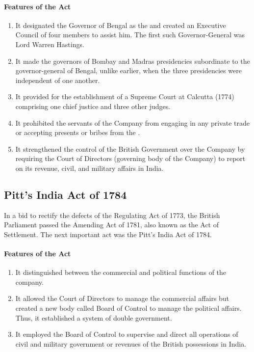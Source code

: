 \paragraph{Features of the Act}

\begin{enumerate}
  \item It designated the Governor of Bengal as the  and created an Executive Council of four members to assist him. The first such Governor-General was Lord Warren Hastings.
  \item It made the governors of Bombay and Madras presidencies subordinate to the governor-general of Bengal, unlike earlier, when the three presidencies were independent of one another.
  \item It provided for the establishment of a Supreme Court at Calcutta (1774) comprising one chief justice and three other judges.
  \item It prohibited the servants of the Company from engaging in any private trade or accepting presents or bribes from the .
  \item It strengthened the control of the British Government over the Company by requiring the Court of Directors (governing body of the Company) to report on its revenue, civil, and military affairs in India.
\end{enumerate}

\subsection{Pitt's India Act of 1784}

In a bid to rectify the defects of the Regulating Act of 1773, the British Parliament passed the Amending Act of 1781, also known as the Act of Settlement. The next important act was the Pitt's India Act of 1784.

\paragraph{Features of the Act}
\begin{enumerate}
  \item It distinguished between the commercial and political functions of the company.
  \item It allowed the Court of Directors to manage the commercial affairs but created a new body called Board of Control to manage the political affairs. Thus, it established a system of double government.
  \item It employed the Board of Control to supervise and direct all operations of civil and military government or revenues of the British possessions in India.
\end{enumerate}

